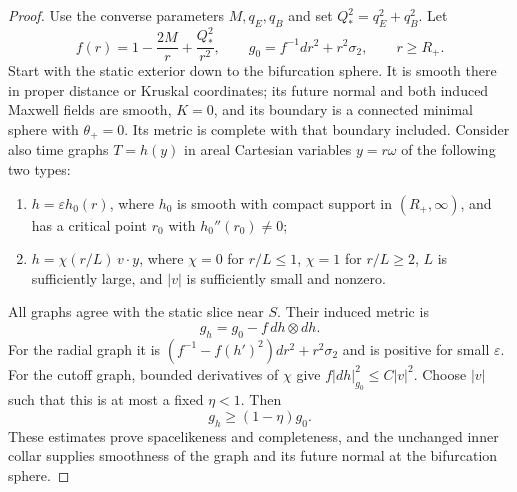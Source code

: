 \begin{proof}
Use the converse parameters $M,q_E,q_B$ and set $Q_*^2=q_E^2+q_B^2$. Let
\[
 f(r)=1-\frac{2M}{r}+\frac{Q_*^2}{r^2},\qquad
 g_0=f^{-1}dr^2+r^2\sigma_2,
 \qquad r\geq R_+.
\]
Start with the static exterior down to the bifurcation sphere.
It is smooth there in proper distance or Kruskal coordinates;
its future normal and both induced Maxwell fields are smooth,
$K=0$, and its boundary is a connected minimal sphere with
$\theta_+=0$.  Its metric is complete with that boundary included.
Consider also time graphs $T=h(y)$ in areal Cartesian variables
$y=r\omega$ of the following two types:
\begin{enumerate}
 \item $h=\varepsilon h_0(r)$, where $h_0$ is smooth with compact
 support in $(R_+,\infty)$, and has a critical point $r_0$ with
 $h_0''(r_0)\ne0$;
 \item $h=\chi(r/L)\,v\cdot y$, where $\chi=0$ for $r/L\leq1$,
 $\chi=1$ for $r/L\geq2$, $L$ is sufficiently large, and $|v|$
 is sufficiently small and nonzero.
\end{enumerate}
All graphs agree with the static slice near $S$.  Their induced
metric is
\begin{equation}
\label{ri:graph-metric}
 g_h=g_0-f\,dh\otimes dh.
\end{equation}
For the radial graph it is
$(f^{-1}-f(h')^2)dr^2+r^2\sigma_2$ and is positive for small
$\varepsilon$.  For the cutoff graph, bounded derivatives of
$\chi$ give $f|dh|_{g_0}^2\leq C|v|^2$.  Choose $|v|$ such that
this is at most a fixed $\eta<1$.  Then
\begin{equation}
\label{ri:metric-domination}
 g_h\geq(1-\eta)g_0.
\end{equation}
These estimates prove spacelikeness and completeness, and the
unchanged inner collar supplies smoothness of the graph and its
future normal at the bifurcation sphere.


\end{proof}
